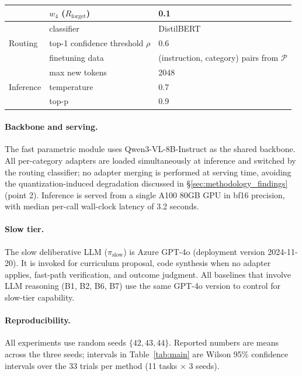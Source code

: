 \documentclass[11pt]{article}
\begin{document}
\begin{table}[h]
\begin{tabular}{lll}
    & $w_4$ ($R_{\text{forget}}$) & 0.1 \\          %
\midrule
\multirow{3}{*}{Routing}
    & classifier         & DistilBERT \\
    & top-1 confidence threshold $\rho$ & 0.6 \\    %
    & finetuning data    & (instruction, category) pairs from $\mathcal{P}$ \\
\midrule
\multirow{3}{*}{Inference}
    & max new tokens     & 2048 \\                  %
    & temperature        & 0.7 \\                   %
    & top-p              & 0.9 \\                   %
\bottomrule
\end{tabular}
\end{table}

\paragraph{Backbone and serving.} The fast parametric module
uses Qwen3-VL-8B-Instruct as the shared
backbone. All per-category adapters are loaded simultaneously
at inference and switched by the routing classifier; no
adapter merging is performed at serving time, avoiding the
quantization-induced degradation discussed in \S\ref{sec:methodology_findings}
(point 2). Inference is served from a single A100 80GB GPU
in bf16 precision, with median per-call wall-clock latency
of 3.2 seconds.    %

\paragraph{Slow tier.} The slow deliberative LLM ($\pi_{\text{slow}}$)
is Azure GPT-4o (deployment version 2024-11-20). It is invoked
for curriculum proposal, code synthesis when no adapter
applies, fast-path verification, and outcome judgment. All
baselines that involve LLM reasoning (B1, B2, B6, B7) use
the same GPT-4o version to control for slow-tier capability.

\paragraph{Reproducibility.} All experiments use random
seeds $\{42, 43, 44\}$. Reported numbers are means across
the three seeds; intervals in Table~\ref{tab:main} are
Wilson 95\% confidence intervals over the 33 trials per
method (11 tasks $\times$ 3 seeds).
\end{document}
